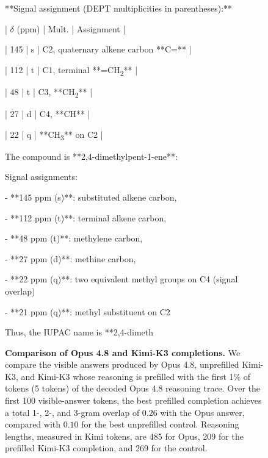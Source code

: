 \begin{figure}[t]
\begin{answercol}[equal height group=ansNMR]
  **Signal assignment (DEPT multiplicities in parentheses):**\par
  {\ttfamily\scriptsize
  | $\delta$ (ppm) | Mult. | Assignment |\par
  | 145 | s | C2, quaternary alkene carbon **C=** |\par
  | 112 | t | C1, terminal **=CH\textsubscript{2}** |\par
  | 48 | t | C3, **CH\textsubscript{2}** |\par
  | 27 | d | C4, **CH** |\par
  | 22 | q | **CH\textsubscript{3}** on C2 |\par}
  \vspace{3pt}\elide
\end{answercol}\hspace{\columnsep}%
\begin{answercol}[equal height group=ansNMR]
  \caret{}\par\vspace{4pt}
  \raggedright The compound is **2,4-dimethylpent-1-ene**:\par\vspace{2pt}
  \detokenize{\[\mathrm{CH_2=C(CH_3)-CH_2-CH(CH_3)_2}\]}\par\vspace{2pt}
  Signal assignments:\par
  - **145 ppm (s)**: substituted alkene carbon, \par
  - **112 ppm (t)**: terminal alkene carbon,
    \par
  - **48 ppm (t)**: methylene carbon, \par
  - **27 ppm (d)**: methine carbon, \par
  - **22 ppm (q)**: two equivalent methyl groups on C4 (signal overlap)\par
  - **21 ppm (q)**: methyl substituent on C2\par
  Thus, the IUPAC name is **2,4-dimeth\par\vspace{3pt}\elide
\end{answercol}

\caption{\textbf{Comparison of Opus 4.8 and Kimi-K3 completions.} We compare
the visible answers produced by Opus 4.8, unprefilled Kimi-K3, and Kimi-K3
whose reasoning is prefilled with the first 1\% of tokens (5 tokens) of the decoded
Opus 4.8 reasoning trace. Over the first 100 visible-answer tokens, the best
prefilled completion achieves a total 1-, 2-, and 3-gram overlap of $0.26$
with the Opus answer, compared with $0.10$ for the best unprefilled control.
Reasoning lengths, measured in Kimi tokens, are 485 for Opus, 209 for the
prefilled Kimi-K3 completion, and 269 for the control.}
\label{fig:hle_nmr_transfer}
\end{figure}
